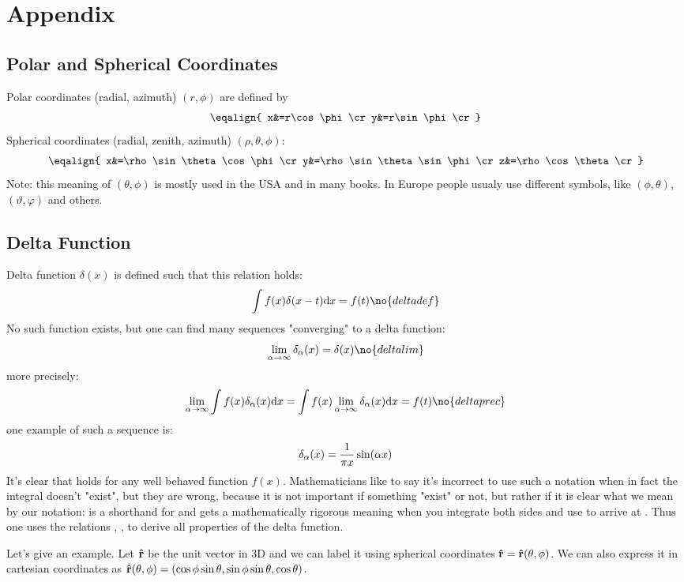 \chapter{Appendix}

\section{Polar and Spherical Coordinates}

Polar coordinates (radial, azimuth) $(r,\phi)$ are defined by
$$\eqalign{
x&=r\cos\phi\cr
y&=r\sin\phi\cr
}$$
Spherical coordinates (radial, zenith, azimuth) $(\rho,\theta,\phi)$:
$$\eqalign{
x&=\rho\sin\theta\cos\phi\cr
y&=\rho\sin\theta\sin\phi\cr
z&=\rho\cos\theta\cr
}$$
Note: this meaning of $(\theta,\phi)$ is mostly used in the USA and in many
books. In Europe people usualy use different symbols, like 
$(\phi,\theta)$, $(\vartheta,\varphi)$ and others.

\section{Delta Function}

Delta function $\delta(x)$ is defined such that this relation holds:
$$\int f(x)\delta(x-t)\d x=f(t)\no{deltadef}$$
No such function exists, but one can find many sequences "converging" to a delta
function:
$$\lim_{\alpha\to\infty}\delta_\alpha(x) = \delta(x)\no{deltalim}$$
more precisely:
$$\lim_{\alpha\to\infty}\int f(x)\delta_\alpha(x)\d x = 
\int f(x)\lim_{\alpha\to\infty}\delta_\alpha(x)\d x = f(t)\no{deltaprec}$$ 
one example of such a sequence is:
$$\delta_\alpha(x) = {1\over\pi x}\sin(\alpha x)$$
It's clear that  holds for any well behaved function $f(x)$.
Mathematicians like to say it's incorrect to use such a notation when in fact
the integral  doesn't "exist", but they are wrong, because it is
not important if something "exist" or not, but rather if it is clear what we
mean by our notation:  is a shorthand for  and
 gets a mathematically rigorous meaning when you integrate both
sides and use  to arrive at . Thus one uses the
relations , ,  to derive all
properties of the delta function. 

Let's give an example. Let ${\bf\hat r}$ be the unit vector in 3D and we can label it using
spherical coordinates ${\bf\hat r}={\bf\hat r}(\theta,\phi)$. We can also
express it in cartesian coordinates as 
${\bf\hat r}(\theta,\phi)=(\cos\phi\sin\theta,\sin\phi\sin\theta,\cos\theta)$.


